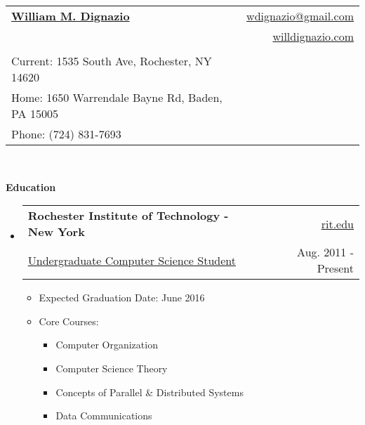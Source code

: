 \documentclass[letterpaper,11pt]{article}
\makeatletter
\newcommand{\resheading}[1]{{\large \colorbox{mygrey}{\begin{minipage}{\textwidth}{\textbf{#1 \vphantom{p\^{E}}}}\end{minipage}}}}
\newcommand{\ressubheading}[4]{
\begin{tabular*}{6.5in}{l@{\extracolsep{\fill}}r}
		\textbf{#1} & #2 \\
		{#3} & {#4} \\
\end{tabular*}\vspace{-6pt}}
\makeatother
\begin{document}
 

\thispagestyle{empty}
\pagestyle{empty}

\newcommand{\mywebheader}{
\begin{tabular*}{7in}{l@{\extracolsep{\fill}}r} \\
	\textbf{\href{http://www.willdignazio.com/}{\large William M. Dignazio}} & \href{mailto:wdignazio@gmail.com}{wdignazio@gmail.com}\\ &
	\href{http://willdignazio.com/}{willdignazio.com} \\ \vspace{-10mm} \\
	{\footnotesize {{Current: 1535 South Ave,
Rochester, NY 14620}}} & \\
	{\footnotesize {{Home: 1650 Warrendale Bayne Rd, Baden, PA 15005}}} & \\
	{\footnotesize {{Phone: (724) 831-7693}}} 	\end{tabular*}
\\
\vspace{0.1in}}

\mywebheader

\resheading{Education}
	{ \footnotesize
	\begin{itemize}
		\item
			\ressubheading{Rochester Institute of Technology - New York}{\href{http://www.rit.edu}{rit.edu}}{\href{http://www.cs.rit.edu/}{Undergraduate Computer Science Student}}{Aug. 2011 - Present}
				{ \footnotesize
				\begin{itemize}
					\item{Expected Graduation Date: June 2016}
					\item{Core Courses:}
						\begin{itemize}
							\item{Computer Organization}
							\item{Computer Science Theory}
							\item{Concepts of Parallel \& Distributed Systems}
							\item{Data Communications}
						\end{itemize}
				\end{itemize}
				}
	\end{itemize} %
	}
\end{document}
